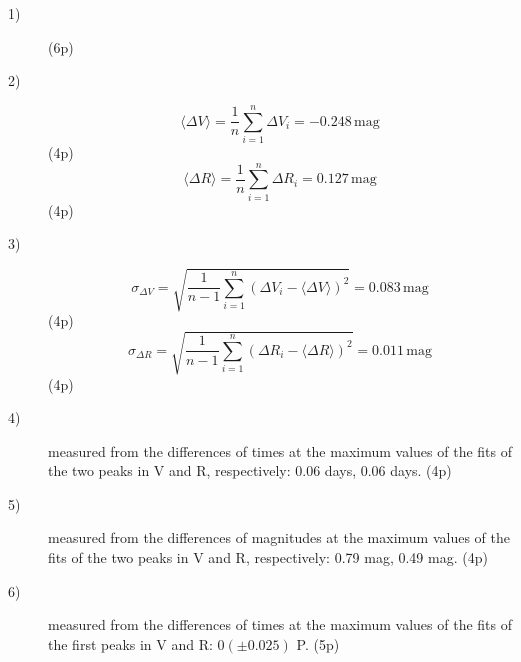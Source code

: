 \begin{description}
  \item[1)] 
  \hfill(6p)

\item[2)]
  \[ \langle \Delta V \rangle = \frac{1}{n} \sum_{i=1}^{n} \Delta V_i
     = -0.248\,\mathrm{mag} \]
  \hfill(4p)
  \[ \langle \Delta R \rangle = \frac{1}{n} \sum_{i=1}^{n} \Delta R_i
     = 0.127\,\mathrm{mag} \]
  \hfill(4p)

\item[3)]
  \[ \sigma_{\Delta V} = \sqrt{ \frac{1}{n-1} \sum_{i=1}^{n}
     \left( \Delta V_i - \langle \Delta V \rangle \right)^2 }
     = 0.083\,\mathrm{mag} \]
  \hfill(4p)
  \[ \sigma_{\Delta R} = \sqrt{ \frac{1}{n-1} \sum_{i=1}^{n}
     \left( \Delta R_i - \langle \Delta R \rangle \right)^2 }
     = 0.011\,\mathrm{mag} \]
  \hfill(4p)

\item[4)] measured from the differences of times at the maximum values of the
  fits of the two peaks in V and R, respectively: 0.06 days, 0.06 days.
  \hfill(4p)

\item[5)] measured from the differences of magnitudes at the maximum values of
  the fits of the two peaks in V and R, respectively: 0.79 mag, 0.49 mag.
  \hfill(4p)

\item[6)] measured from the differences of times at the maximum values of the
  fits of the first peaks in V and R: $0(\pm 0.025)$ P. \hfill(5p)
\end{description}

